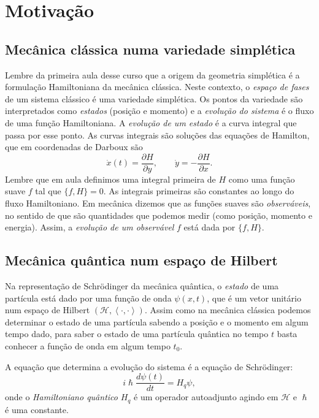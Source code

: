 \section{Motivação}


\subsection{Mecânica clássica numa variedade simplética}

Lembre da primeira aula desse curso que a origem da geometria simplética é a formulação Hamiltoniana da mecânica clássica. Neste contexto, o \textit{espaço de fases}  de um sistema clássico é uma variedade simplética. Os pontos da variedade são interpretados como \textit{estados}  (posição e momento) e a \textit{evolução do sistema} é o fluxo de uma função Hamiltoniana. A \textit{evolução de um estado} é a curva integral que passa por esse ponto. As curvas integrais são soluções das equações de Hamilton, que em coordenadas de Darboux são
\[\dot x(t)=\frac{\partial H}{\partial y},\qquad \dot y=-\frac{\partial H}{\partial x}.\]
Lembre que em aula definimos uma integral primeira de $H$ como uma função suave $f$ tal que $\{f,H\}=0$. As integrais primeiras são constantes ao longo do fluxo Hamiltoniano. Em mecânica dizemos que as funções suaves são \textit{observáveis}, no sentido de que são quantidades que podemos medir (como posição, momento e energia). Assim, a \textit{evolução de um observável} $f$ está dada por $\{f, H\}$.

\subsection{Mecânica quântica num espaço de Hilbert}

Na representação de Schrödinger da mecânica quântica, o \textit{estado}  de uma partícula está dado por uma função de onda $\psi(x,t)$, que é um vetor unitário num espaço de Hilbert $(\mathcal{H},\left<\cdot,\cdot\right>)$. Assim como na mecânica clássica podemos determinar o estado de uma partícula sabendo a posição e o momento em algum tempo dado, para saber o estado de uma partícula quântica no tempo $t$ basta conhecer a função de onda em algum tempo $t_0$.

A equação que determina a evolução do sistema é a equação de Schrödinger:
\[i \hslash \frac{d\psi(t)}{dt}=H_q\psi,\]
onde o \textit{Hamiltoniano quântico} $H_q$ é um operador autoadjunto agindo em $\mathcal{H}$ e $\hslash$ é uma constante.

